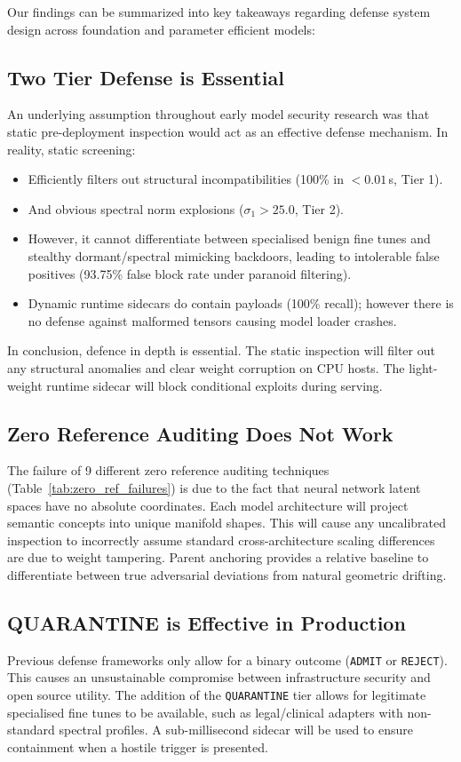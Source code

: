 \documentclass[conference]{IEEEtran}
\begin{document}
Our findings can be summarized into key takeaways regarding defense system design across foundation and parameter efficient models:

\subsection{Two Tier Defense is Essential}
An underlying assumption throughout early model security research was that static pre-deployment inspection would act as an effective defense mechanism. In reality, static screening:
\begin{itemize}
    \item Efficiently filters out structural incompatibilities (100\% in $< 0.01$\,s, Tier 1).
    \item And obvious spectral norm explosions ($\sigma_1 > 25.0$, Tier 2).
    \item However, it cannot differentiate between specialised benign fine tunes and stealthy dormant/spectral mimicking backdoors, leading to intolerable false positives (93.75\% false block rate under paranoid filtering).
    \item Dynamic runtime sidecars do contain payloads (100\% recall); however there is no defense against malformed tensors causing model loader crashes.
\end{itemize}
In conclusion, defence in depth is essential. The static inspection will filter out any structural anomalies and clear weight corruption on CPU hosts. The light-weight runtime sidecar will block conditional exploits during serving.

\subsection{Zero Reference Auditing Does Not Work}
The failure of 9 different zero reference auditing techniques (Table~\ref{tab:zero_ref_failures}) is due to the fact that neural network latent spaces have no absolute coordinates. Each model architecture will project semantic concepts into unique manifold shapes. This will cause any uncalibrated inspection to incorrectly assume standard cross-architecture scaling differences are due to weight tampering. Parent anchoring provides a relative baseline to differentiate between true adversarial deviations from natural geometric drifting.

\subsection{QUARANTINE is Effective in Production}
Previous defense frameworks only allow for a binary outcome (\texttt{ADMIT} or \texttt{REJECT}). This causes an unsustainable compromise between infrastructure security and open source utility. The addition of the \texttt{QUARANTINE} tier allows for legitimate specialised fine tunes to be available, such as legal/clinical adapters with non-standard spectral profiles. A sub-millisecond sidecar will be used to ensure containment when a hostile trigger is presented.
\end{document}
